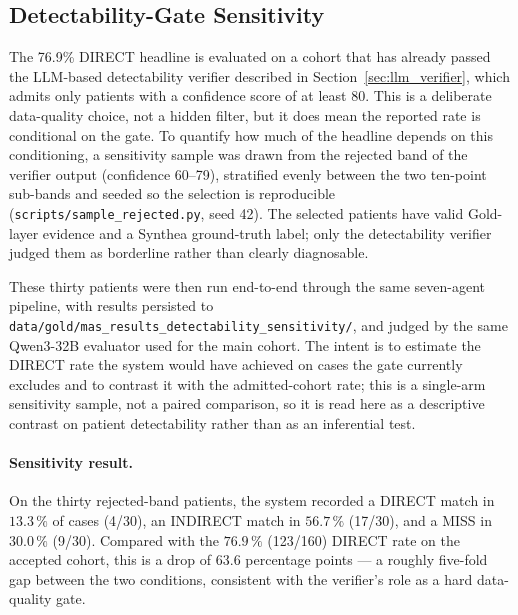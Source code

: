 \subsection{Detectability-Gate Sensitivity}
\label{sec:results_detectability_sensitivity}

The 76.9\% DIRECT headline is evaluated on a cohort that has already passed
the LLM-based detectability verifier described in
Section~\ref{sec:llm_verifier}, which admits only patients with a
confidence score of at least 80. This is a deliberate data-quality choice,
not a hidden filter, but it does mean the reported rate is conditional on
the gate. To quantify how much of the headline depends on this conditioning,
a sensitivity sample was drawn from the rejected band of the verifier
output (confidence 60--79), stratified evenly between the two ten-point
sub-bands and seeded so the selection is reproducible
(\texttt{scripts/sample\_rejected.py}, seed 42). The selected patients have
valid Gold-layer evidence and a Synthea ground-truth label; only the
detectability verifier judged them as borderline rather than clearly
diagnosable.

These thirty patients were then run end-to-end through the same seven-agent
pipeline, with results persisted to
\texttt{data/gold/mas\_results\_detectability\_sensitivity/}, and judged by
the same Qwen3-32B evaluator used for the main cohort. The intent is to
estimate the DIRECT rate the system would have achieved on cases the gate
currently excludes and to contrast it with the admitted-cohort rate; this
is a single-arm sensitivity sample, not a paired comparison, so it is
read here as a descriptive contrast on patient detectability rather than
as an inferential test.

\paragraph{Sensitivity result.}
On the thirty rejected-band patients, the system recorded a DIRECT match
in $13.3\,\%$ of cases (4/30), an INDIRECT match in $56.7\,\%$ (17/30),
and a MISS in $30.0\,\%$ (9/30). Compared with the $76.9\,\%$ (123/160)
DIRECT rate on the accepted cohort, this is a drop of
$63.6$ percentage points --- a roughly five-fold gap between the two
conditions, consistent with the verifier's role as a hard
data-quality gate.

